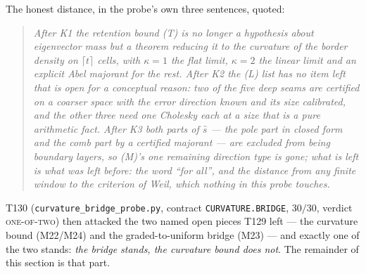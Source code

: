 \documentclass[11pt,a4paper]{article}
\begin{document}
\noindent The honest distance, in the probe's own three sentences, quoted:

\begin{quote}\itshape
After K1 the retention bound (T) is no longer a hypothesis about eigenvector mass but a
theorem reducing it to the curvature of the border density on $\lceil t\rceil$ cells, with
$\kappa=1$ the flat limit, $\kappa=2$ the linear limit and an explicit Abel majorant for the
rest. After K2 the (L) list has no item left that is open for a conceptual reason: two of the
five deep seams are certified on a coarser space with the error direction known and its size
calibrated, and the other three need one Cholesky each at a size that is a pure arithmetic
fact. After K3 both parts of $\hat s$ --- the pole part in closed form and the comb part by a
certified majorant --- are excluded from being boundary layers, so (M)'s one remaining
direction type is gone; what is left is what was left before: the word ``for all'', and the
distance from any finite window to the criterion of Weil, which nothing in this probe touches.
\end{quote}

\noindent T130 (\texttt{curvature\_bridge\_probe.py}, contract \texttt{CURVATURE.BRIDGE},
$30/30$, verdict \textsc{one-of-two}) then attacked the two named open pieces T129 left ---
the curvature bound (M22/M24) and the graded-to-uniform bridge (M23) --- and exactly one of
the two stands: \emph{the bridge stands, the curvature bound does not}. The remainder of this
section is that part.
\end{document}
